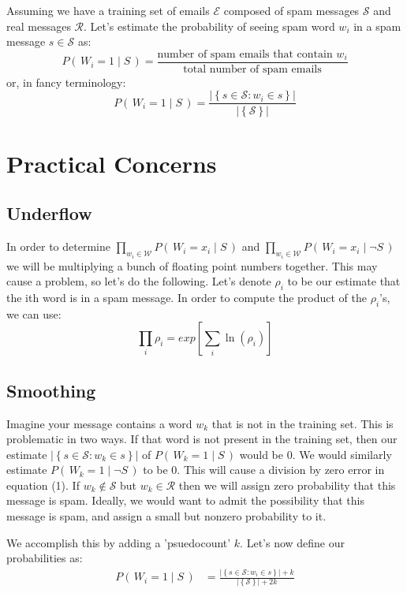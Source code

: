 \documentclass[11pt, oneside]{article}   	%
\begin{document}
Assuming we have a training set of emails \(\mathcal{E}\) composed of spam messages \(\mathcal{S}\) and real messages \(\mathcal{R}\). Let's estimate the probability of seeing spam word $w_i$ in a spam message $s \in \mathcal{S}$ as:
\[
P(\,W_i=1 \mid S\,)=\frac{\text{number of spam emails that contain } w_i}{\text{total number of spam emails}} 
\]
or, in fancy terminology:
\begin{equation}
P(\,W_i=1 \mid S\,)=\frac{ \left\vert\left\{ s \in \mathcal{S} : w_i \in s \right\}\right\vert }{\left\vert\left\{ \mathcal{S} \right\}\right\vert}
\end{equation}

\section*{Practical Concerns}
\subsection*{Underflow} In order to determine $\prod_{w_i \in \mathcal{W}} P(\,W_i=x_i \mid S\,)$ and $\prod_{w_i \in \mathcal{W}} P(\,W_i=x_i \mid \neg S\,)$ we will be multiplying a bunch of floating point numbers together. This may cause a problem, so let's do the following. Let's denote $\rho_i$ to be our estimate that the ith word is in a spam message. In order to compute the product of the $\rho_i$'s, we can use:
\begin{equation}
\prod_i \rho_i = exp \left[ \sum_i \ln(\rho_i) \right]
\end{equation}
\subsection*{Smoothing}Imagine your message contains a word $w_k$ that is not in the training set. This is problematic in two ways. If that word is not present in the training set, then our estimate $\left\vert\left\{ s \in \mathcal{S} : w_k \in s \right\}\right\vert$ of $P(\,W_k=1 \mid S\,)$ would be 0. We would similarly estimate $P(\,W_k=1 \mid \neg S\,)$ to be 0. This will cause a division by zero error in equation (1). If $w_k \notin \mathcal{S}$ but $w_k \in \mathcal{R}$ then we will assign zero probability that this message is spam. Ideally, we would want to admit the possibility that this message is spam, and assign a small but nonzero probability to it.

We accomplish this by adding a 'psuedocount' $k$. Let's now define our probabilities as:
\begin{align}
P(\,W_i=1 \mid S\,)&=\frac{\left\vert\left\{ s \in \mathcal{S} : w_i \in s \right\}\right\vert + k}{\left\vert\left\{ \mathcal{S} \right\} \right\vert + 2k} 
\end{align}
 
\end{document}
